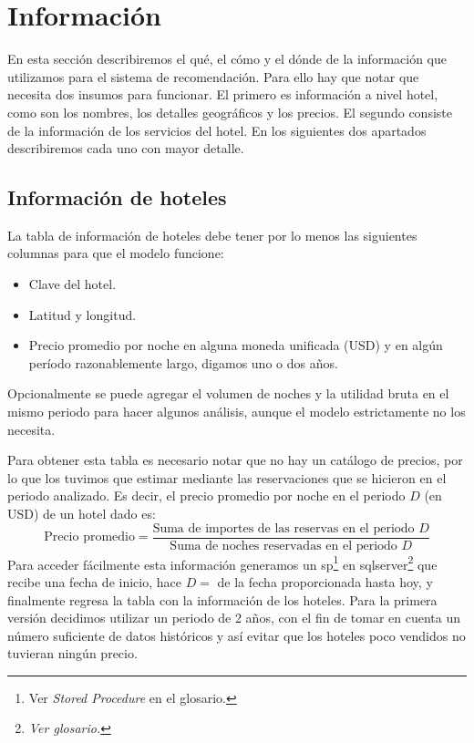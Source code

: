 \documentclass[12pt]{report}
\begin{document}
\section{Información}

En esta sección describiremos el qué, el cómo y el dónde de la información que utilizamos para el sistema de recomendación. Para ello hay que notar que necesita dos insumos para funcionar. El primero es información a nivel hotel, como son los nombres, los detalles geográficos y los precios. El segundo consiste de la información de los servicios del hotel. En los siguientes dos apartados describiremos cada uno con mayor detalle.

\subsection*{Información de hoteles}

La tabla de información de hoteles debe tener por lo menos las siguientes columnas para que el modelo funcione:
\begin{itemize}
	\item Clave del hotel.
	\item Latitud y longitud.
	\item Precio promedio por noche en alguna moneda unificada (USD) y en algún período razonablemente largo, digamos uno o dos años.
\end{itemize}
Opcionalmente se puede agregar el volumen de noches y la utilidad bruta en el mismo periodo para hacer algunos análisis, aunque el modelo estrictamente no los necesita.

Para obtener esta tabla es necesario notar que no hay un catálogo de precios, por lo que los tuvimos que estimar mediante las reservaciones que se hicieron en el periodo analizado. Es decir, el precio promedio por noche en el periodo $D$ (en USD) de un hotel dado es:
\[
\text{Precio promedio} = \frac{\text{Suma de importes de las reservas en el periodo } D}{\text{Suma de noches reservadas en el periodo } D}
\]
Para acceder fácilmente esta información generamos un \gls{sp}\footnote{Ver \emph{Stored Procedure} en el glosario.} en \gls{sqlserver}\footnote{\textit{Ver glosario.}} que recibe una fecha de inicio, hace $D = $ de la fecha proporcionada hasta hoy, y finalmente regresa la tabla con la información de los hoteles. Para la primera versión decidimos utilizar un periodo de 2 años, con el fin de tomar en cuenta un número suficiente de datos históricos y así evitar que los hoteles poco vendidos no tuvieran ningún precio.
\end{document}
